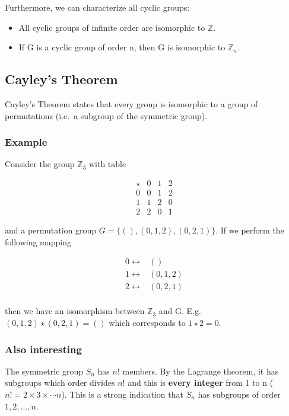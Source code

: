 Furthermore, we can characterize all cyclic groups:

\begin{itemize}
\item
  All cyclic groups of infinite order are isomorphic to \(\mathbb{Z}\).
\item
  If G is a cyclic group of order n, then G is isomorphic to
  \(\mathbb{Z}_n\).
\end{itemize}

\subsection{Cayley's Theorem}\label{cayleys-theorem}

Cayley's Theorem states that every group is isomorphic to a group of
permutations (i.e.~a subgroup of the symmetric group).

\subsubsection{Example}\label{example-1}

Consider the group \(\mathbb{Z}_3\) with table

\[
\begin{array}{c|ccc}
\star & 0 & 1 & 2 \\ \hline
0       & 0 & 1 & 2 \\
1       & 1 & 2 & 0 \\
2       & 2 & 0 & 1
\end{array}
\]

and a permutation group \(G = \{(), (0,1,2), (0,2,1)\}\). If we perform
the following mapping

\[
\begin{array}{cc}
0 \leftrightarrow & ()  \\
1 \leftrightarrow & (0,1,2)  \\
2 \leftrightarrow & (0,2,1)  \\
\end{array}
\]

then we have an isomorphism between \(\mathbb{Z}_3\) and G. E.g.
\((0,1,2) \star (0,2,1) = ()\) which corresponds to \(1 \star 2 = 0\).

\subsubsection{Also interesting}\label{also-interesting}

The symmetric group \(S_n\) has \(n!\) members. By the Lagrange theorem,
it has subgroups which order divides \(n!\) and this is \textbf{every
integer} from 1 to n (\(n! = 2 \times 3 \times \cdots n\)). This is a
strong indication that \(S_n\) has subgroups of order \(1,2,\ldots,n\).


